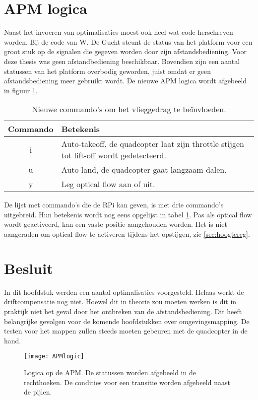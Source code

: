 \section{APM logica}
Naast het invoeren van optimalisaties moest ook heel wat code herschreven worden. Bij de code van W. De Gucht steunt de status van het platform voor een groot stuk op de signalen die gegeven worden door zijn afstandsbediening. Voor deze thesis was geen afstandbediening beschikbaar. Bovendien zijn een aantal statussen van het platform overbodig geworden, juist omdat er geen afstandsbediening meer gebruikt wordt. De nieuwe APM logica wordt afgebeeld in figuur \ref{fig:APMlogic}.

\begin{table}[h]
	\caption{Nieuwe commando's om het vlieggedrag te be\"invloeden.}\label{table:newcom}
	\centering
	\begin{tabular}{cp{.7\linewidth}}
		\cr
		\hline
		Commando & Betekenis \\
		\hline
		i & Auto-takeoff, de quadcopter laat zijn throttle stijgen tot lift-off wordt gedetecteerd. \\
		u & Auto-land, de quadcopter gaat langzaam dalen. \\
		y & Leg optical flow aan of uit.\\
		\hline	
	\end{tabular}
\end{table}


\npar De lijst met commando's die de RPi kan geven, is met drie commando's uitgebreid. Hun betekenis wordt nog eens opgelijst in tabel \ref{table:newcom}. Pas als optical flow wordt geactiveerd, kan een vaste positie aangehouden worden. Het is niet aangeraden om optical flow te activeren tijdens het opstijgen, zie \ref{sec:hoogtereg}.

\section{Besluit}
In dit hoofdstuk werden een aantal optimalisaties voorgesteld. Helaas werkt de driftcompensatie nog niet. Hoewel dit in theorie zou moeten werken is dit in praktijk niet het geval door het ontbreken van de afstandsbediening. Dit heeft belangrijke gevolgen voor de komende hoofdstukken over omgevingsmapping. De testen voor het mappen zullen steeds moeten gebeuren met de quadcopter in de hand.

\begin{figure}[h]
	\centering
	\texttt{[image: APMlogic]}
	\caption{Logica op de APM. De statussen worden afgebeeld in de rechthoeken. De condities voor een transitie worden afgebeeld naast de pijlen.} \label{fig:APMlogic}
\end{figure}



